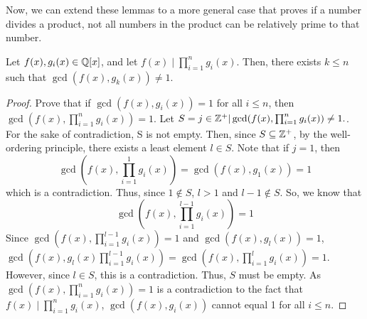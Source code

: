 Now, we can extend these lemmas to a more general case that proves if a number divides a product, not all numbers in the product can be relatively prime to that number.
\begin{theorem}
    Let $f(x),g_i(x)\in\mathbb{Q}[x]$, and let $f(x) \mid \prod_{i=1}^n g_i(x)$. Then, there exists $k 
    \leq n$ such that $\gcd(f(x), g_k(x)) \neq 1$. 
\end{theorem}
\begin{proof}
    Prove that if $\gcd(f(x), g_i(x)) = 1$ for all $i \leq n$, then $\gcd(f(x), \prod_{i=1}^n g_i(x)) = 1$.
    Let $S= {j \in \mathbb{Z}^+ | \operatorname{gcd}(f(x), \prod_{i=1}^n g_i(x)) \neq 1}.$. For the sake of contradiction, S is not empty. Then, since $S\subseteq \mathbb{Z}^+$, by the well-ordering principle, there exists a least element $l \in S$. Note that if $j=1$, then \[
        \gcd(f(x), \prod_{i=1}^1 g_i(x))  = \gcd(f(x), g_1(x))  =  1
    \]which is a contradiction. Thus, since $1 \notin S$, $l>1$ and $l-1 \notin S$. So, we know that \[
    \gcd(f(x), \prod_{i=1}^{l-1} g_i(x)) =  1
    \] Since $\gcd(f(x), \prod_{i=1}^{l-1} g_i(x)) =  1$ and $\gcd(f(x), g_l(x)) =  1$, $\gcd(f(x), g_l(x)\prod_{i=1}^{l-1} g_i(x)) =\gcd(f(x), \prod_{i=1}^{l} g_i(x)) =  1$. However, since $l \in S$, this is a contradiction. Thus, $S$ must be empty.
    As $\gcd(f(x), \prod_{i=1}^n g_i(x)) = 1$ is a contradiction to the fact that $f(x) \mid \prod_{i=1}^n g_i(x)$,  $\gcd(f(x), g_i(x)) $ cannot equal 1 for all $i \leq n$.
\end{proof}



